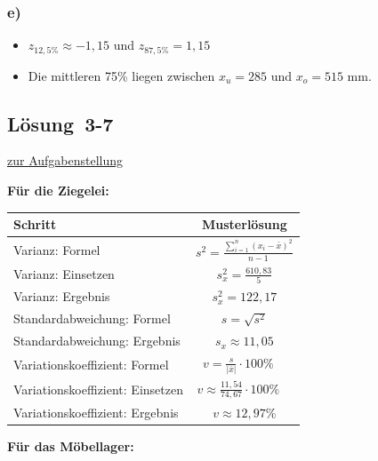 \documentclass[
  11pt,
  ngerman,
  a4paper,
]{report}
\providecommand{\tightlist}{%
  \setlength{\itemsep}{0pt}\setlength{\parskip}{0pt}}
\begin{document}
\hypertarget{e-1}{%
\subsubsection{e)}\label{e-1}}

\begin{itemize}
\tightlist
\item
  \(z_{12,5\%}\approx -1,15\) und \(z_{87,5\%}= 1,15\)
\item
  Die mittleren 75\% liegen zwischen \(x_u=285\) und \(x_o=515\) mm.
\end{itemize}

\hypertarget{loesung-3-7}{%
\subsection{Lösung~3-7}\label{loesung-3-7}}

\protect\hyperlink{aufgabe-3-7}{zur Aufgabenstellung}

\textbf{Für die Ziegelei:}

\begin{table}[H]
\centering
\begin{tabular}{lc}
\toprule
Schritt & Musterlösung\\
\midrule
Varianz: Formel & $s^2=\frac{\sum\limits_{i=1}^{n}(x_{i}-\bar{x})^2}{n-1}$\\
Varianz: Einsetzen & $s^2_x=\frac{610{,}83}{5}$\\
Varianz: Ergebnis & $s^2_x=122{,}17$\\
Standardabweichung: Formel & $s=\sqrt{s^2}$\\
Standardabweichung: Ergebnis & $s_x\approx11{,}05$\\
Variationskoeffizient: Formel & $v=\frac{s}{|\bar{x}|}\cdot100\%\quad$\\
Variationskoeffizient: Einsetzen & $v\approx\frac{11,54}{74,67}\cdot100\%\quad$\\
Variationskoeffizient: Ergebnis & $v \approx 12{,}97\%$\\
\bottomrule
\end{tabular}
\end{table}

\textbf{Für das Möbellager:}
\end{document}
